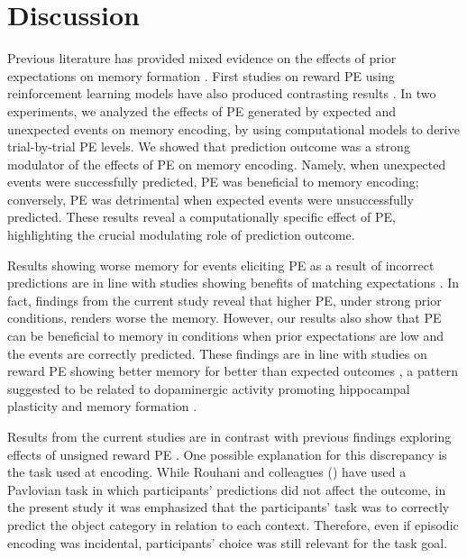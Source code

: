 \documentclass[a4paper,12pt]{article} 			%
\begin{document}
\section{Discussion}
Previous literature has provided mixed evidence on the effects of prior expectations on memory formation \citep{Bein2015, BrodGarvinShingYee2019, Greve2017, Kafkas2018}. First studies on reward PE using reinforcement learning models have also produced contrasting results \citep{Jang2019, de2018signed,Rouhani2018, Rouhani2021}. In two experiments, we analyzed the effects of PE generated by expected and unexpected events on memory encoding, by using computational models to derive trial-by-trial PE levels. We showed that prediction outcome was a strong modulator of the effects of PE on memory encoding. Namely, when unexpected events were successfully predicted, PE was beneficial to memory encoding; conversely, PE was detrimental when expected events were unsuccessfully predicted. These results reveal a computationally specific effect of PE, highlighting the crucial modulating role of prediction outcome. \par
Results showing worse memory for events eliciting PE as a result of incorrect predictions are in line with studies showing benefits of matching expectations \citep{Bein2015, BrodGarvinShingYee2019, VanKesteren2013}⁠. In fact, findings from the current study reveal that higher PE, under strong prior conditions, renders worse the memory. However, our results also show that PE can be beneficial to memory in conditions when prior expectations are low and the events are correctly predicted. These findings are in line with studies on reward PE showing better memory for better than expected outcomes \citep{de2018signed, Jang2019}, a pattern suggested to be related to dopaminergic activity promoting hippocampal plasticity and memory formation \citep{Bethus2010,Rosen2015}⁠.\par
Results from the current studies are in contrast with previous findings exploring effects of unsigned reward PE \citep{Rouhani2018, Rouhani2021}. One possible explanation for this discrepancy is the task used at encoding. While Rouhani and colleagues (\citeyear{Rouhani2018, Rouhani2021}) have used a Pavlovian task in which participants’ predictions did not affect the outcome, in the present study it was emphasized that the participants’ task was to correctly predict the object category in relation to each context. Therefore, even if episodic encoding was incidental, participants’ choice was still relevant for the task goal. \par
\end{document}
